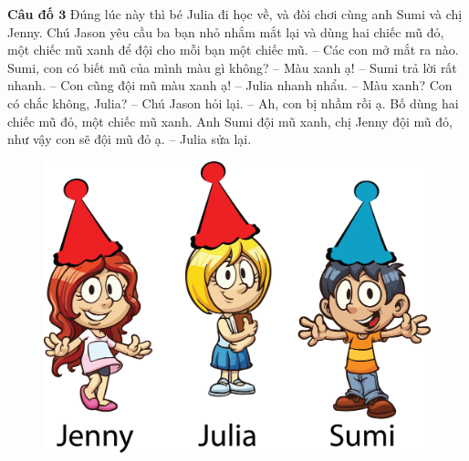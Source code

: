 	\begin{multicols}{2}
		\textbf{\color{toancuabi}Câu đố $\pmb3$}
		\vskip 0.1cm
		Đúng lúc này thì bé Julia đi học về, và đòi chơi cùng anh Sumi và chị Jenny. Chú Jason yêu cầu ba bạn nhỏ nhắm mắt lại và dùng hai chiếc mũ đỏ, một chiếc mũ xanh để đội cho mỗi bạn một chiếc mũ.
		\vskip 0.1cm
		-- Các con mở mắt ra nào. Sumi, con có biết mũ của mình màu gì không?
		\vskip 0.1cm
		-- Màu xanh ạ! -- Sumi trả lời rất nhanh.
		\vskip 0.1cm
		-- Con cũng đội mũ màu xanh ạ! -- Julia  nhanh nhẩu.
		\vskip 0.1cm
		-- Màu xanh? Con có chắc không, Julia? -- Chú Jason hỏi lại.
		\vskip 0.1cm
		-- Ah, con bị nhầm rồi ạ. Bố dùng hai chiếc mũ đỏ, một chiếc mũ xanh. Anh Sumi đội mũ xanh, chị Jenny đội mũ đỏ, như vậy con sẽ đội mũ đỏ ạ. – Julia sửa lại.
		\begin{figure}[H]
			\centering
			\vspace*{-5pt}
			\captionsetup{labelformat= empty, justification=centering}
			\includegraphics[width=1\linewidth]{h3}
			\vspace*{-10pt}
		\end{figure}
	\end{multicols}
	
